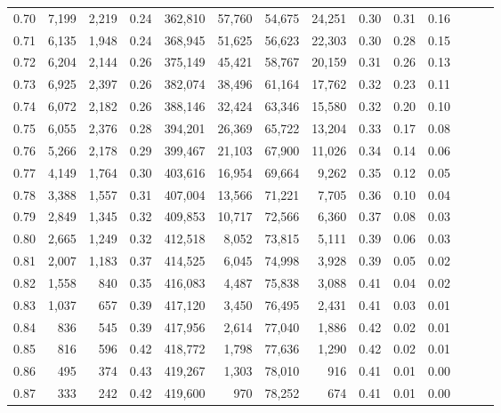 \begin{tabular}{rrrrrrrrrrrrrr}
0.70 &   7,199 &  2,219 &  0.24 &  362,810 &   57,760 &  54,675 &  24,251 &  0.30 &  0.31 &      0.16 \\
0.71 &   6,135 &  1,948 &  0.24 &  368,945 &   51,625 &  56,623 &  22,303 &  0.30 &  0.28 &      0.15 \\
0.72 &   6,204 &  2,144 &  0.26 &  375,149 &   45,421 &  58,767 &  20,159 &  0.31 &  0.26 &      0.13 \\
0.73 &   6,925 &  2,397 &  0.26 &  382,074 &   38,496 &  61,164 &  17,762 &  0.32 &  0.23 &      0.11 \\
0.74 &   6,072 &  2,182 &  0.26 &  388,146 &   32,424 &  63,346 &  15,580 &  0.32 &  0.20 &      0.10 \\
0.75 &   6,055 &  2,376 &  0.28 &  394,201 &   26,369 &  65,722 &  13,204 &  0.33 &  0.17 &      0.08 \\
0.76 &   5,266 &  2,178 &  0.29 &  399,467 &   21,103 &  67,900 &  11,026 &  0.34 &  0.14 &      0.06 \\
0.77 &   4,149 &  1,764 &  0.30 &  403,616 &   16,954 &  69,664 &   9,262 &  0.35 &  0.12 &      0.05 \\
0.78 &   3,388 &  1,557 &  0.31 &  407,004 &   13,566 &  71,221 &   7,705 &  0.36 &  0.10 &      0.04 \\
0.79 &   2,849 &  1,345 &  0.32 &  409,853 &   10,717 &  72,566 &   6,360 &  0.37 &  0.08 &      0.03 \\
0.80 &   2,665 &  1,249 &  0.32 &  412,518 &    8,052 &  73,815 &   5,111 &  0.39 &  0.06 &      0.03 \\
0.81 &   2,007 &  1,183 &  0.37 &  414,525 &    6,045 &  74,998 &   3,928 &  0.39 &  0.05 &      0.02 \\
0.82 &   1,558 &    840 &  0.35 &  416,083 &    4,487 &  75,838 &   3,088 &  0.41 &  0.04 &      0.02 \\
0.83 &   1,037 &    657 &  0.39 &  417,120 &    3,450 &  76,495 &   2,431 &  0.41 &  0.03 &      0.01 \\
0.84 &     836 &    545 &  0.39 &  417,956 &    2,614 &  77,040 &   1,886 &  0.42 &  0.02 &      0.01 \\
0.85 &     816 &    596 &  0.42 &  418,772 &    1,798 &  77,636 &   1,290 &  0.42 &  0.02 &      0.01 \\
0.86 &     495 &    374 &  0.43 &  419,267 &    1,303 &  78,010 &     916 &  0.41 &  0.01 &      0.00 \\
0.87 &     333 &    242 &  0.42 &  419,600 &      970 &  78,252 &     674 &  0.41 &  0.01 &      0.00 \\

\end{tabular}
